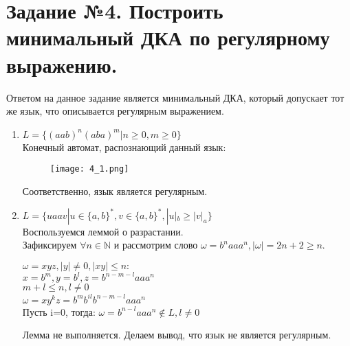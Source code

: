 \documentclass[12pt, a4paper]{article}
\begin{document}
\section{Задание №4. Построить минимальный ДКА по регулярному выражению.}
Ответом на данное задание является минимальный ДКА, который допускает тот же язык, что описывается регулярным выражением.
\begin{enumerate}
    \item \(L=\{(aab)^n(aba)^m | n \geq 0, m \geq 0\} \)
\\Конечный автомат, распознающий данный язык:

\begin{comment}
digraph {
    rankdir="LR"
    "" [shape=point]
    q1 [shape=circle]
    q2 [shape=doublecircle]
    q3 [shape=circle]
    q4 [shape=circle]
    q5 [shape=circle]
    q6 [shape=circle]

    "" -> q1
    q1 -> q2 [label="b"]
    q1 -> q3 [label="a"]
    q3 -> q4 [label="a"]
    q4 -> q1 [label="b"]
    q2 -> q5 [label="a"]
    q5 -> q6 [label="b"]
    q6 -> q2 [label="a"]
}
\end{comment}

    \begin{figure}[H]
        \centering
        \texttt{[image: 4\_1.png]}
    \end{figure}
Соответственно, язык является регулярным.

    \item \(L=\{uaav | u \in \{a,b\}^*, v \in \{a,b\}^*, |u|_b \geq |v|_a\}\)
\\Воспользуемся леммой о разрастании.
\\Зафиксируем \(\forall n \in \mathbb{N}\) и рассмотрим слово \(\omega = b^naaa^n, |\omega|=2n+2 \geq n\).
\begin{center}
\(\omega = xyz, |y| \neq 0, |xy| \leq n:\)
\\\(x=b^m, y=b^l, z=b^{n-m-l}aaa^n\)
\\\(m+l \leq n, l \neq 0\)
\\\(\omega = xy^kz=b^mb^{il}b^{n-m-l}aaa^n\)
\\Пусть i=0, тогда: \(\omega = b^{n-l}aaa^n \notin L, l \neq 0\)
\end{center}
Лемма не выполняется. Делаем вывод, что язык не является регулярным.


\end{enumerate}
\end{document}
